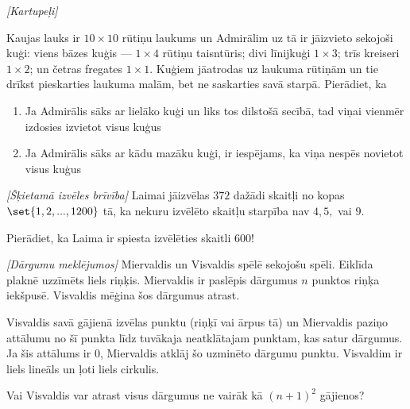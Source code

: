 



\renewcommand{\theenumi}{\alph{enumi}}



\noindent 

\begin{problem}
\textit{[Kartupeļi]}

Kaujas lauks ir $10 \times 10$ rūtiņu laukums un Admirālim uz tā ir jāizvieto sekojoši kuģi: viens bāzes kuģis --- $1 \times 4$ rūtiņu taisntūris; divi līnijkuģi $1\times3$; trīs kreiseri $1\times2$; un četras fregates $1\times1$. Kuģiem jāatrodas uz laukuma rūtiņām un tie drīkst pieskarties laukuma malām, bet ne saskarties savā starpā. Pierādiet, ka

\begin{enumerate}
\item Ja Admirālis sāks ar lielāko kuģi un liks tos dilstošā secībā, tad viņai vienmēr izdosies izvietot visus kuģus
\item Ja Admirālis sāks ar kādu mazāku kuģi, ir iespējams, ka viņa nespēs novietot visus kuģus
\end{enumerate}
\end{problem}
%

\begin{problem}
\textit{[Šķietamā izvēles brīvība]}
Laimai jāizvēlas $372$ dažādi skaitļi no kopas $\set{1,2,...,1200}$ tā, ka nekuru izvēlēto skaitļu starpība nav $4,5,$ vai $9$.

Pierādiet, ka Laima ir spiesta izvēlēties skaitli $600$!
\end{problem}
%


\begin{problem}
\textit{[Dārgumu meklējumos]}
Miervaldis un Visvaldis spēlē sekojošu spēli. Eiklīda plaknē uzzīmēts liels riņķis. Miervaldis ir paslēpis dārgumus $n$ punktos riņķa iekšpusē. Visvaldis mēģina šos dārgumus atrast.

Visvaldis savā gājienā izvēlas punktu (riņķī vai ārpus tā) un Miervaldis paziņo attālumu no šī punkta līdz tuvākaja neatklātajam punktam, kas satur dārgumus. Ja šis attālums ir $0$, Miervaldis atklāj šo uzminēto dārgumu punktu. Visvaldim ir liels lineāls un ļoti liels cirkulis. 

Vai Visvaldis var atrast visus dārgumus ne vairāk kā $(n+1)^2$ gājienos?
\end{problem}
%

